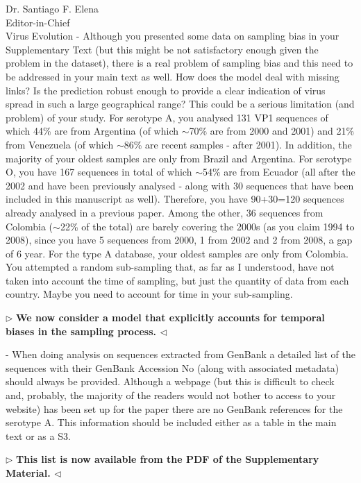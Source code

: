 \documentclass[12pt, a4paper]{letter} %
\newenvironment{reply}{$\triangleright$\bf}{$\triangleleft$}
\begin{document}
\begin{letter}{
	Dr. Santiago F. Elena\\
    Editor-in-Chief \\
    Virus Evolution
}
-       Although you presented some data on sampling bias in your Supplementary Text (but this might be not satisfactory enough given the problem in the dataset), there is a real problem of sampling bias and this need to be addressed in your main text as well. 
How does the model deal with missing links? 
Is the prediction robust enough to provide a clear indication of virus spread in such a large geographical range? 
This could be a serious limitation (and problem) of your study. For serotype A, you analysed 131 VP1 sequences of which 44\% are from Argentina (of which $\sim$70\% are from 2000 and 2001) and 21\% from Venezuela (of which $\sim$86\% are recent samples - after 2001). 
In addition, the majority of your oldest samples are only from Brazil and Argentina. For serotype O, you have 167 sequences in total of which $\sim$54\% are from Ecuador (all after the 2002 and have been previously analysed - along with 30 sequences that have been included in this manuscript as well). 
Therefore, you have 90+30=120 sequences already analysed in a previous paper. 
Among the other, 36 sequences from Colombia ($\sim$22\% of the total) are barely covering the 2000s (as you claim 1994 to 2008), since you have 5 sequences from 2000, 1 from 2002 and 2 from 2008, a gap of 6 year. 
For the type A database, your oldest samples are only from Colombia. You attempted a random sub-sampling that, as far as I understood, have not taken into account the time of sampling, but just the quantity of data from each country. 
Maybe you need to account for time in your sub-sampling.

\begin{reply}
We now consider a model that explicitly accounts for temporal biases in the sampling process. 
\end{reply}

-       When doing analysis on sequences extracted from GenBank a detailed list of the sequences with their GenBank Accession No (along with associated metadata) should always be provided. 
Although a webpage (but this is difficult to check and, probably, the majority of the readers would not bother to access to your website) has been set up for the paper there are no GenBank references for the serotype A. 
This information should be included either as a table in the main text or as a S3.

\begin{reply}
This list is now available from the PDF of the Supplementary Material.
\end{reply}


\end{letter}
\end{document}
